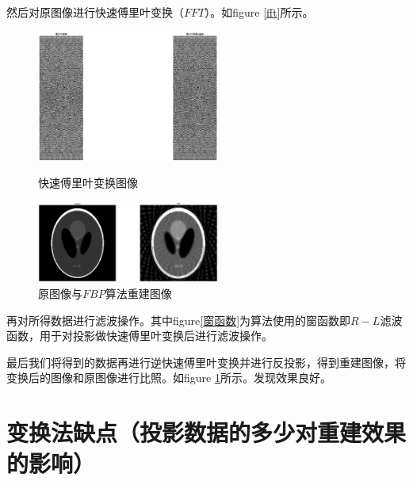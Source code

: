 \documentclass[hyperref]{ctexart}
\begin{document}
				然后对原图像进行快速傅里叶变换（$FFT$）。如figure \ref{fft}所示。
			\begin{figure}
			  \begin{minipage}[ht!]{0.5\linewidth}
			    \centering
					\includegraphics[width=60mm]{fourier_transform.eps}
					\caption{快速傅里叶变换图像 \label{fft}}
			  \end{minipage}%
			  \begin{minipage}[ht!]{0.5\linewidth}
			    \centering
					\includegraphics[width=60mm]{fbp256.eps}
					\caption{原图像与$FBP$算法重建图像 \label{fbp对比图像}}
			  \end{minipage}
			\end{figure}

				再对所得数据进行滤波操作。其中figure\ref{窗函数}为算法使用的窗函数即$R-L$滤波函数，用于对投影做快速傅里叶变换后进行滤波操作。
				
				最后我们将得到的数据再进行逆快速傅里叶变换并进行反投影，得到重建图像，将变换后的图像和原图像进行比照。如figure \ref{fbp对比图像}所示。发现效果良好。

	\section{变换法缺点（投影数据的多少对重建效果的影响）}
		
\end{document}
